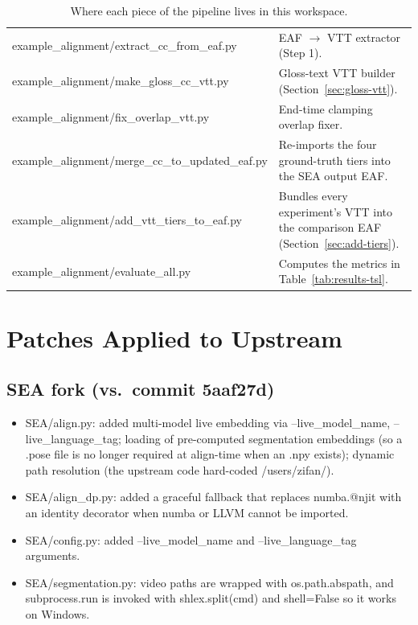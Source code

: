 \documentclass[11pt,a4paper]{article}
\def\texttt#1{#1}%
\def\textbf#1{#1}%
\begin{document}
\begin{table}[h]
\begin{tabularx}{\linewidth}{lX}
\texttt{example\_alignment/extract\_cc\_from\_eaf.py} & EAF $\to$ VTT
                                       extractor (Step 1). \\
\texttt{example\_alignment/make\_gloss\_cc\_vtt.py}   & Gloss-text VTT
                                       builder (Section~\ref{sec:gloss-vtt}). \\
\texttt{example\_alignment/fix\_overlap\_vtt.py}      & End-time clamping
                                       overlap fixer. \\
\texttt{example\_alignment/merge\_cc\_to\_updated\_eaf.py} & Re-imports the
                                       four ground-truth tiers into the SEA
                                       output EAF. \\
\texttt{example\_alignment/add\_vtt\_tiers\_to\_eaf.py} & Bundles every
                                       experiment's VTT into the comparison
                                       EAF (Section~\ref{sec:add-tiers}). \\
\texttt{example\_alignment/evaluate\_all.py}          & Computes the metrics
                                       in Table~\ref{tab:results-tsl}. \\
\bottomrule
\end{tabularx}
\caption{Where each piece of the pipeline lives in this workspace.}
\label{tab:code-map}
\end{table}

\section{Patches Applied to Upstream}
\label{sec:patches}

\subsection{SEA fork (vs.\ commit \texttt{5aaf27d})}
\begin{itemize}[leftmargin=1.5em]
\item \textbf{\texttt{SEA/align.py}}: added multi-model live embedding via
      \texttt{--live\_model\_name}, \texttt{--live\_language\_tag}; loading
      of pre-computed segmentation embeddings (so a \texttt{.pose} file is
      no longer required at align-time when an \texttt{.npy} exists);
      dynamic path resolution (the upstream code hard-coded
      \texttt{/users/zifan/}).
\item \textbf{\texttt{SEA/align\_dp.py}}: added a graceful fallback that
      replaces \texttt{numba.@njit} with an identity decorator when numba
      or LLVM cannot be imported.
\item \textbf{\texttt{SEA/config.py}}: added \texttt{--live\_model\_name}
      and \texttt{--live\_language\_tag} arguments.
\item \textbf{\texttt{SEA/segmentation.py}}: video paths are wrapped with
      \texttt{os.path.abspath}, and \texttt{subprocess.run} is invoked with
      \texttt{shlex.split(cmd)} and \texttt{shell=False} so it works on
      Windows.
\end{itemize}
\end{document}
